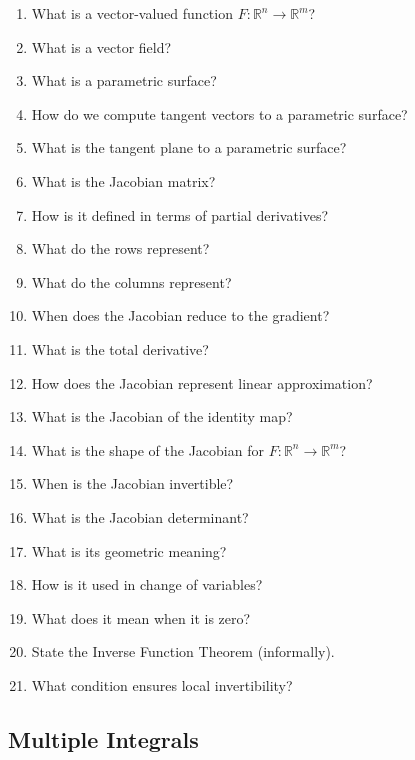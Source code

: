 \begin{enumerate}[resume]
  \item What is a vector-valued function $F:\mathbb{R}^n \to \mathbb{R}^m$?
  \item What is a vector field?
  \item What is a parametric surface?
  \item How do we compute tangent vectors to a parametric surface?
  \item What is the tangent plane to a parametric surface?
  \item What is the Jacobian matrix?
  \item How is it defined in terms of partial derivatives?
  \item What do the rows represent?
  \item What do the columns represent?
  \item When does the Jacobian reduce to the gradient?
  \item What is the total derivative?
  \item How does the Jacobian represent linear approximation?
  \item What is the Jacobian of the identity map?
  \item What is the shape of the Jacobian for $F:\mathbb{R}^n \to \mathbb{R}^m$?
  \item When is the Jacobian invertible?
  \item What is the Jacobian determinant?
  \item What is its geometric meaning?
  \item How is it used in change of variables?
  \item What does it mean when it is zero?
  \item State the Inverse Function Theorem (informally).
  \item What condition ensures local invertibility?
\end{enumerate}

\subsection{Multiple Integrals}

